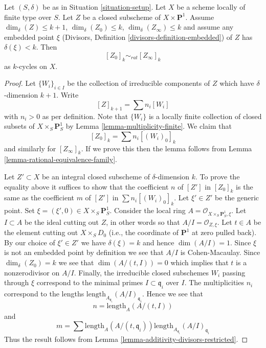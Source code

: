 \begin{lemma}
\label{lemma-closed-subscheme-cross-p1}
Let $(S, \delta)$ be as in Situation \ref{situation-setup}.
Let $X$ be a scheme locally of finite type over $S$.
Let $Z$ be a closed subscheme of $X \times \mathbf{P}^1$.
Assume $\dim_\delta(Z) \leq k + 1$, $\dim_\delta(Z_0) \leq k$,
$\dim_\delta(Z_\infty) \leq k$ and assume
any embedded point $\xi$
(Divisors, Definition \ref{divisors-definition-embedded})
of $Z$ has $\delta(\xi) < k$. Then
$$
[Z_0]_k \sim_{rat} [Z_\infty]_k
$$
as $k$-cycles on $X$.
\end{lemma}

\begin{proof}
Let $\{W_i\}_{i \in I}$ be the collection of irreducible
components of $Z$ which have $\delta$-dimension $k + 1$.
Write
$$
[Z]_{k + 1} = \sum n_i[W_i]
$$
with $n_i > 0$ as per definition. Note that $\{W_i\}$
is a locally finite collection of closed subsets of
$X \times_S \mathbf{P}^1_S$ by Lemma \ref{lemma-multiplicity-finite}.
We claim that
$$
[Z_0]_k = \sum n_i[(W_i)_0]_k
$$
and similarly for $[Z_\infty]_k$. If we prove this then the lemma
follows from Lemma \ref{lemma-rational-equivalence-family}.

\medskip\noindent
Let $Z' \subset X$ be an integral closed subscheme of $\delta$-dimension $k$.
To prove the equality above it suffices to show that the coefficient $n$
of $[Z']$ in $[Z_0]_k$ is the same as the coefficient $m$ of
$[Z']$ in $\sum n_i[(W_i)_0]_k$. Let $\xi' \in Z'$ be the generic point.
Set $\xi = (\xi', 0) \in  X \times_S \mathbf{P}^1_S$.
Consider the local ring $A = \mathcal{O}_{X \times_S \mathbf{P}^1_S, \xi}$.
Let $I \subset A$ be the ideal cutting out $Z$, in other words so that
$A/I = \mathcal{O}_{Z, \xi}$. Let $t \in A$ be the element cutting
out $X \times_S D_0$ (i.e., the coordinate of $\mathbf{P}^1$ at zero
pulled back). By our choice of $\xi' \in Z'$ we have $\delta(\xi) = k$
and hence $\dim(A/I) = 1$. Since $\xi$ is not an embedded point by
definition we see that $A/I$ is Cohen-Macaulay. Since $\dim_\delta(Z_0)
= k$ we see that $\dim(A/(t, I)) = 0$ which implies that $t$
is a nonzerodivisor on $A/I$. Finally, the irreducible closed subschemes
$W_i$ passing through $\xi$ correspond to the minimal primes
$I \subset \mathfrak q_i$ over $I$. The multiplicities $n_i$ correspond
to the lengths $\text{length}_{A_{\mathfrak q_i}}(A/I)_{\mathfrak q_i}$.
Hence we see that
$$
n = \text{length}_A(A/(t, I))
$$
and
$$
m = \sum
\text{length}_A(A/(t, \mathfrak q_i))
\text{length}_{A_{\mathfrak q_i}}(A/I)_{\mathfrak q_i}
$$
Thus the result follows from
Lemma \ref{lemma-additivity-divisors-restricted}.
\end{proof}

